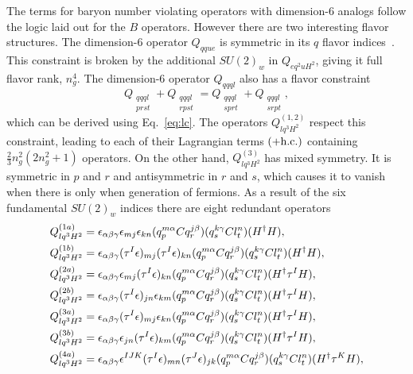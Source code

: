 \begin{enumerate}
The terms for baryon number violating operators with dimension-6 analogs follow the logic laid out for the $B$ operators.
However there are two interesting flavor structures.
The dimension-6 operator $Q_{qque}$ is symmetric in its $q$ flavor indices~\cite{Abbott:1980zj}.
This constraint is broken by the additional $SU(2)_w$ in $Q_{eq^2uH^2}$, giving it full flavor rank, $n_g^4$.
The dimension-6 operator $Q_{qqql}$ also has a flavor constraint~\cite{Abbott:1980zj}
\begin{equation}
\label{eq:qqql}
Q_{\substack{qqql \\ prst}} + Q_{\substack{qqql \\ rpst}} = Q_{\substack{qqql \\ sprt}} + Q_{\substack{qqql \\ srpt}},
\end{equation}
which can be derived using Eq.~\eqref{eq:lc}.
The operators $Q_{lq^3H^2}^{(1, 2)}$ respect this constraint, leading to each of their Lagrangian terms $(+ \mathrm{h.c.})$ containing $\tfrac{2}{3} n_g^2 (2 n_g^2 + 1)$ operators.
On the other hand, $Q_{lq^3H^2}^{(3)}$ has mixed symmetry.
It is symmetric in $p$ and $r$ and antisymmetric in $r$ and $s$, which causes it to vanish when there is only when generation of fermions.
As a result of the six fundamental $SU(2)_w$ indices there are eight redundant operators
\begin{align}
\label{eq:lq3h2}
Q_{lq^3H^2}^{(1a)} &= \epsilon_{\alpha\beta\gamma} \epsilon_{mj} \epsilon_{kn} (q_p^{m\alpha} C q_r^{j\beta}) (q_s^{k\gamma} C l_t^n) (H^\dag H) , \nn
%
Q_{lq^3H^2}^{(1b)} &= \epsilon_{\alpha\beta\gamma} (\tau^I \epsilon)_{mj} (\tau^I \epsilon)_{kn} (q_p^{m\alpha} C q_r^{j\beta}) (q_s^{k\gamma} C l_t^n) (H^\dag H) , \nn 
%
Q_{lq^3H^2}^{(2a)} &= \epsilon_{\alpha\beta\gamma} \epsilon_{mj} (\tau^I \epsilon)_{kn} (q_p^{m\alpha} C q_r^{j\beta}) (q_s^{k\gamma} C l_t^n) (H^\dag \tau^I H) , \nn
%
Q_{lq^3H^2}^{(2b)} &= \epsilon_{\alpha\beta\gamma} (\tau^I \epsilon)_{jn} \epsilon_{km}  (q_p^{m\alpha} C q_r^{j\beta}) (q_s^{k\gamma} C l_t^n) (H^\dag \tau^I H) , \nn
%
Q_{lq^3H^2}^{(3a)} &= \epsilon_{\alpha\beta\gamma} (\tau^I \epsilon)_{mj} \epsilon_{kn} (q_p^{m\alpha} C q_r^{j\beta}) (q_s^{k\gamma} C l_t^n) (H^\dag \tau^I H) , \nn
%
Q_{lq^3H^2}^{(3b)} &= \epsilon_{\alpha\beta\gamma} \epsilon_{jn} (\tau^I \epsilon)_{km} (q_p^{m\alpha} C q_r^{j\beta}) (q_s^{k\gamma} C l_t^n) (H^\dag \tau^I H) , \nn
%
Q_{lq^3H^2}^{(4a)} &= \epsilon_{\alpha\beta\gamma} \epsilon^{IJK} (\tau^I \epsilon)_{mn} (\tau^J \epsilon)_{jk} (q_p^{m\alpha} C q_r^{j\beta}) (q_s^{k\gamma} C l_t^n) (H^\dag \tau^K H) , \nn

\end{align}
\end{enumerate}
